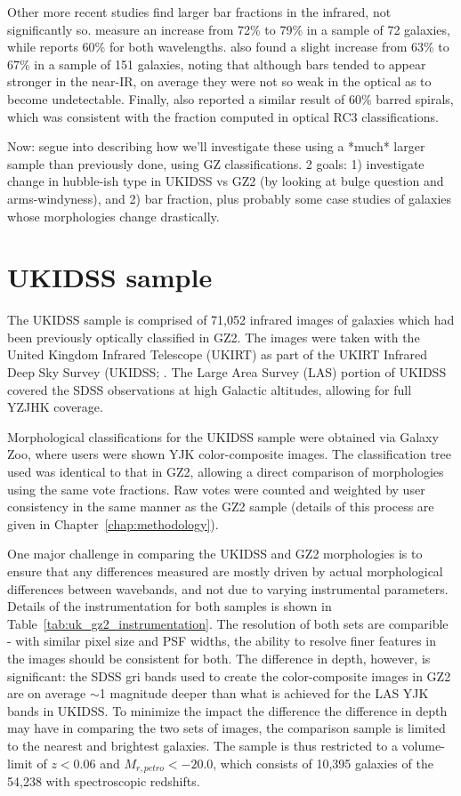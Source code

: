 Other more recent studies find larger bar fractions in the infrared, not significantly so. \citet{Whyte2002} measure an increase from 72\% to 79\% in a sample of 72 galaxies, while \citet{Sheth2008} reports 60\% for both wavelengths. \citet{MenendezDelmestre2007} also found a slight increase from 63\% to 67\% in a sample of 151 galaxies, noting that although bars tended to appear stronger in the near-IR, on average they were not so weak in the optical as to become undetectable. Finally, \citet{Buta2010} also reported a similar result of 60\% barred spirals, which was consistent with the fraction computed in optical RC3 classifications.

Now: segue into describing how we'll investigate these using a *much* larger sample than previously done, using GZ classifications. 2 goals: 1) investigate change in hubble-ish type in UKIDSS vs GZ2 (by looking at bulge question and arms-windyness), and 2) bar fraction, plus probably some case studies of galaxies whose morphologies change drastically.   

\section{UKIDSS sample}

The UKIDSS sample is comprised of 71,052 infrared images of galaxies which had been previously optically classified in GZ2. The images were taken with the United Kingdom Infrared Telescope (UKIRT) as part of the UKIRT Infrared Deep Sky Survey (UKIDSS; \citet{Lawrence2007,Warren2007}. The Large Area Survey (LAS) portion of UKIDSS covered the SDSS observations at high Galactic altitudes, allowing for full YZJHK coverage.  

Morphological classifications for the UKIDSS sample were obtained via Galaxy Zoo, where users were shown YJK color-composite images. The classification tree used was identical to that in GZ2, allowing a direct comparison of morphologies using the same vote fractions. Raw votes were counted and weighted by user consistency in the same manner as the GZ2 sample (details of this process are given in Chapter~\ref{chap:methodology}).

One major challenge in comparing the UKIDSS and GZ2 morphologies is to ensure that any differences measured are mostly driven by actual morphological differences between wavebands, and not due to varying instrumental parameters. Details of the instrumentation for both samples is shown in Table~\ref{tab:uk_gz2_instrumentation}. The resolution of both sets are comparible - with similar pixel size and PSF widths, the ability to resolve finer features in the images should be consistent for both. The difference in depth, however, is significant: the SDSS gri bands used to create the color-composite images in GZ2 are on average $\sim$1 magnitude deeper than what is achieved for the LAS YJK bands in UKIDSS. To minimize the impact the difference the difference in depth may have in comparing the two sets of images, the comparison sample is limited to the nearest and brightest galaxies. 
The sample is thus restricted to a volume-limit of $z<0.06$ and $M_{r,petro}<-20.0$, which consists of 10,395 galaxies of the 54,238 with spectroscopic redshifts.

